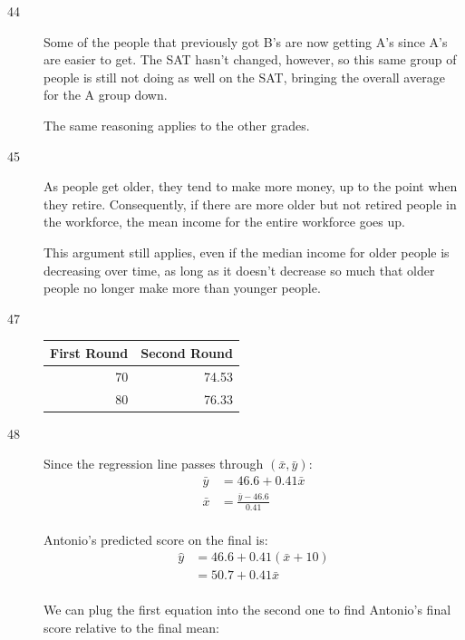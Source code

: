 \documentclass[letterpaper]{exam}
\begin{document}
\begin{description}
      \item[44]
        Some of the people that previously got B's are now getting A's since A's
        are easier to get.  The SAT hasn't changed, however, so this same group
        of people is still not doing as well on the SAT, bringing the overall
        average for the A group down.

        The same reasoning applies to the other grades.

      \item[45]
        As people get older, they tend to make more money, up to the point when
        they retire.  Consequently, if there are more older but not retired
        people in the workforce, the mean income for the entire workforce goes
        up.

        This argument still applies, even if the median income for older people
        is decreasing over time, as long as it doesn't decrease so much that
        older people no longer make more than younger people.

      \item[47]
        \begin{tabular}[H]{rr}
          \toprule
          First Round & Second Round \\
          \midrule
          70          & 74.53 \\
          80          & 76.33 \\
          \bottomrule
        \end{tabular}

      \item[48]
        Since the regression line passes through $(\bar{x}, \bar{y})$:
        \begin{align*}
          \bar{y} & = 46.6 + 0.41 \bar{x} \\
          \bar{x} & = \frac{\bar{y} - 46.6}{0.41} \\
        \end{align*}

        Antonio's predicted score on the final is:
        \begin{align*}
          \hat{y} & = 46.6 + 0.41 (\bar{x} + 10) \\
                  & = 50.7 + 0.41 \bar{x} \\
        \end{align*}

        We can plug the first equation into the second one to find Antonio's
        final score relative to the final mean:


\end{description}
\end{document}
